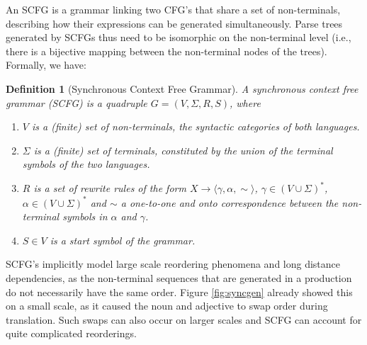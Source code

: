 \documentclass{report}
\theoremstyle{break}
\newtheorem{definition}{Definition}
\begin{document}
An SCFG \citep{aho1969properties} is a grammar linking two CFG's that share a set of non-terminals, describing how their expressions can be generated simultaneously. Parse trees generated by SCFGs thus need to be isomorphic on the non-terminal level (i.e., there is a bijective mapping between the non-terminal nodes of the trees). Formally, we have:

\begin{definition}[Synchronous Context Free Grammar]
A synchronous context free grammar (SCFG) is a quadruple $G = (V, \Sigma, R, S)$, where\begin{enumerate}
\item $V$ is a (finite) set of non-terminals, the syntactic categories of both languages.
\item $\Sigma$ is a (finite) set of terminals, constituted by the union of the terminal symbols of the two languages.
\item $R$ is a set of rewrite rules of the form $X\rightarrow\langle\gamma,\alpha,\sim\rangle$, $\gamma\in (V\cup\Sigma)^{*}$,  $\alpha\in (V\cup\Sigma)^{*}$ and $\sim$ a one-to-one and onto correspondence between the non-terminal symbols in $\alpha$ and $\gamma$.
\item $S\in V$ is a start symbol of the grammar.
\end{enumerate}
\end{definition}

SCFG's implicitly model large scale reordering phenomena and long distance dependencies, as the non-terminal sequences that are generated in a production do not necessarily have the same order. Figure \ref{fig:syncgen} already showed this on a small scale, as it caused the noun and adjective to swap order during translation. Such swaps can also occur on larger scales and SCFG can account for quite complicated reorderings.
\end{document}
